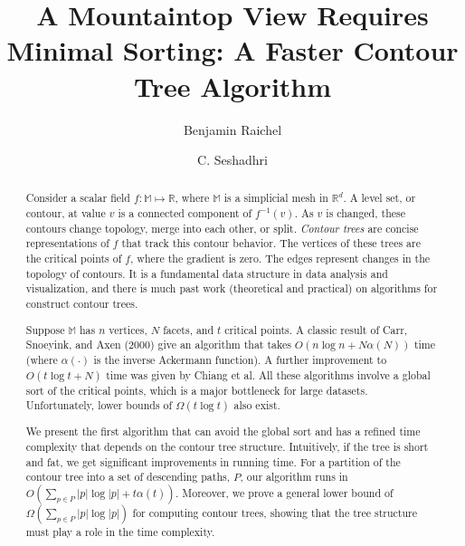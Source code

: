 \documentclass[11pt]{article}
\author{
  Benjamin Raichel
  \and
  C. Seshadhri
}
\title{A Mountaintop View Requires Minimal Sorting: \break A Faster Contour Tree Algorithm}
\date{}
\newcommand{\ignore}[1]{}
\theoremstyle{definition}
\newcommand{\MM}{\mathbb{M}}
\newcommand{\RR}{\mathbb{R}}
\begin{document}
\maketitle

\begin{abstract}
Consider a scalar field $f:\MM \mapsto \RR$, where $\MM$ is a simplicial mesh in $\RR^d$. 
A level set, or contour, at value $v$ is a connected component of $f^{-1}(v)$. 
As $v$ is changed, these contours change topology, merge into each other, or split.
\emph{Contour trees} are concise representations of $f$ that track this contour
behavior. The vertices of these trees are the critical points of $f$, where the gradient is zero.
The edges represent changes in the topology of contours.
It is a fundamental data structure in data analysis and visualization,
and there is much past work (theoretical and practical) on algorithms for construct contour trees.

Suppose $\MM$ has $n$ vertices, $N$ facets, and $t$ critical points.
A classic result of Carr, Snoeyink, and Axen (2000) give an algorithm that takes $O(n\log n + N\alpha(N))$ time
(where $\alpha(\cdot)$ is the inverse Ackermann function). A further improvement to $O(t\log t + N)$ time
was given by Chiang et al. All these algorithms involve a global sort of the critical points,
which is a major bottleneck for large datasets. Unfortunately, lower bounds of $\Omega(t\log t)$ also exist.

We present the first algorithm that can avoid the global sort and has a refined time complexity that
depends on the contour tree structure. Intuitively, if the tree is short and fat, we get significant improvements 
in running time. For a partition of the contour tree into a set of descending paths, $P$,
our algorithm runs in $O(\sum_{p\in P} |p|\log|p| + t\alpha(t))$. Moreover, we prove a general lower bound of
$\Omega(\sum_{p \in P} |p|\log |p|)$ for computing contour trees, showing
that the tree structure must play a role in the time complexity.


\ignore{
Moreover, we show there   
exists some partition $P'$ such that the running time of our algorithm is 
$O(\sum_{p\in P'} |p|\log|p| + N\alpha(N))$, where $N$ is the total complexity of the input manifold 

All previous contour tree algorithms involve a global sort 
of the heights of all points or critical vertices. Thereby, these algorithms always pay $\Omega(t \log t)$.
This is a major roadblock for efficiency, since sorting is the most expensive operation

}
\end{abstract}
\end{document}
